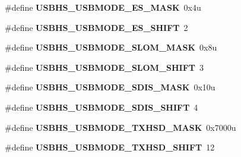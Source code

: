 \begin{DoxyCompactItemize}
\item 
\hypertarget{group___u_s_b_h_s___register___masks_ga639aab2e62e234483e120de23edab5e4}{}\#define {\bfseries U\+S\+B\+H\+S\+\_\+\+U\+S\+B\+M\+O\+D\+E\+\_\+\+E\+S\+\_\+\+M\+A\+S\+K}~0x4u\label{group___u_s_b_h_s___register___masks_ga639aab2e62e234483e120de23edab5e4}

\item 
\hypertarget{group___u_s_b_h_s___register___masks_gaeaaf1e36a1b3286aa43751546a67cf7a}{}\#define {\bfseries U\+S\+B\+H\+S\+\_\+\+U\+S\+B\+M\+O\+D\+E\+\_\+\+E\+S\+\_\+\+S\+H\+I\+F\+T}~2\label{group___u_s_b_h_s___register___masks_gaeaaf1e36a1b3286aa43751546a67cf7a}

\item 
\hypertarget{group___u_s_b_h_s___register___masks_gaabc62878f8db5fccc28d3438a6606b09}{}\#define {\bfseries U\+S\+B\+H\+S\+\_\+\+U\+S\+B\+M\+O\+D\+E\+\_\+\+S\+L\+O\+M\+\_\+\+M\+A\+S\+K}~0x8u\label{group___u_s_b_h_s___register___masks_gaabc62878f8db5fccc28d3438a6606b09}

\item 
\hypertarget{group___u_s_b_h_s___register___masks_ga12e52f0bf42841109acfba17f247cba3}{}\#define {\bfseries U\+S\+B\+H\+S\+\_\+\+U\+S\+B\+M\+O\+D\+E\+\_\+\+S\+L\+O\+M\+\_\+\+S\+H\+I\+F\+T}~3\label{group___u_s_b_h_s___register___masks_ga12e52f0bf42841109acfba17f247cba3}

\item 
\hypertarget{group___u_s_b_h_s___register___masks_ga3a163a7d637707bed55e22ee53ccd56e}{}\#define {\bfseries U\+S\+B\+H\+S\+\_\+\+U\+S\+B\+M\+O\+D\+E\+\_\+\+S\+D\+I\+S\+\_\+\+M\+A\+S\+K}~0x10u\label{group___u_s_b_h_s___register___masks_ga3a163a7d637707bed55e22ee53ccd56e}

\item 
\hypertarget{group___u_s_b_h_s___register___masks_gaba197791908df959a51d57149d70cf5d}{}\#define {\bfseries U\+S\+B\+H\+S\+\_\+\+U\+S\+B\+M\+O\+D\+E\+\_\+\+S\+D\+I\+S\+\_\+\+S\+H\+I\+F\+T}~4\label{group___u_s_b_h_s___register___masks_gaba197791908df959a51d57149d70cf5d}

\item 
\hypertarget{group___u_s_b_h_s___register___masks_ga6a106ea99dd1bb9c04b2ed79c6dee20f}{}\#define {\bfseries U\+S\+B\+H\+S\+\_\+\+U\+S\+B\+M\+O\+D\+E\+\_\+\+T\+X\+H\+S\+D\+\_\+\+M\+A\+S\+K}~0x7000u\label{group___u_s_b_h_s___register___masks_ga6a106ea99dd1bb9c04b2ed79c6dee20f}

\item 
\hypertarget{group___u_s_b_h_s___register___masks_ga8a8dfc000357f50a12110ce5b0766098}{}\#define {\bfseries U\+S\+B\+H\+S\+\_\+\+U\+S\+B\+M\+O\+D\+E\+\_\+\+T\+X\+H\+S\+D\+\_\+\+S\+H\+I\+F\+T}~12\label{group___u_s_b_h_s___register___masks_ga8a8dfc000357f50a12110ce5b0766098}


\end{DoxyCompactItemize}
